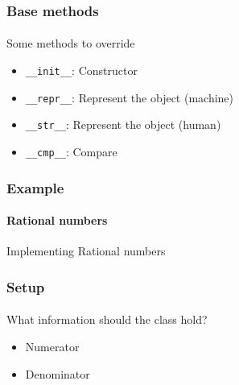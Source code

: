 





\begin{frame}[fragile]\frametitle{Base methods}
    \framesubtitle{}

    Some methods to override
    \begin{itemize}
        \item \verb|__init__|: Constructor
        \item \verb|__repr__|: Represent the object (machine)
        \item \verb|__str__|: Represent the object (human)
        \item \verb|__cmp__|: Compare
    \end{itemize}

\end{frame}






\begin{frame}\frametitle{Example}
    \framesubtitle{Rational numbers}

    Implementing Rational numbers

    \vfill


\end{frame}

\begin{frame}\frametitle{Setup}
    \framesubtitle{}

    What information should the class hold?

    \pause

    \begin{itemize}
        \item Numerator
        \item Denominator
    \end{itemize}

\end{frame}

